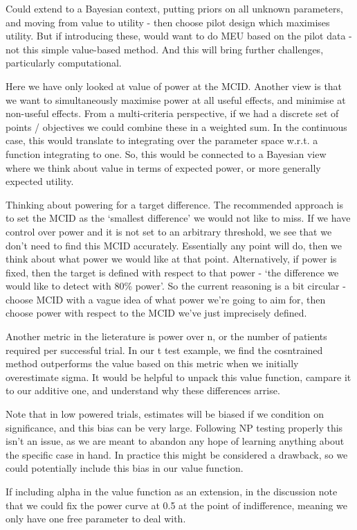 \documentclass[sagev, Crown]{sagej}
\begin{document}
Could extend to a Bayesian context, putting priors on all unknown parameters, and moving from value to utility - then choose pilot design which maximises utility. But if introducing these, would want to do MEU based on the pilot data - not this simple value-based method. And this will bring further challenges, particularly computational.

Here we have only looked at value of power at the MCID. Another view is that we want to simultaneously maximise power at all useful effects, and minimise at non-useful effects. From a multi-criteria perspective, if we had a discrete set of points / objectives we could combine these in a weighted sum. In the continuous case, this would translate to integrating over the parameter space w.r.t. a function integrating to one. So, this would be connected to a Bayesian view where we think about value in terms of expected power, or more generally expected utility. 

Thinking about powering for a target difference. The recommended approach is to set the MCID as the `smallest difference' we would not like to miss. If we have control over power and it is not set to an arbitrary threshold, we see that we don't need to find this MCID accurately. Essentially any point will do, then we think about what power we would like at that point. Alternatively, if power is fixed, then the target is defined with respect to that power - `the difference we would like to detect with 80\% power'. So the current reasoning is a bit circular - choose MCID with a vague idea of what power we're going to aim for, then choose power with respect to the MCID we've just imprecisely defined.

Another metric in the lieterature is power over n, or the number of patients required per successful trial. In our t test example, we find the cosntrained method outperforms the value based on this metric when we initially overestimate sigma. It would be helpful to unpack this value function, campare it to our additive one, and understand why these differences arrise.

Note that in low powered trials, estimates will be biased if we condition on significance, and this bias can be very large. Following NP testing properly this isn't an issue, as we are meant to abandon any hope of learning anything about the specific case in hand. In practice this might be considered a drawback, so we could potentially include this bias in our value function.

If including alpha in the value function as an extension, in the discussion note that we could fix the power curve at 0.5 at the point of indifference, meaning we only have one free parameter to deal with.
\end{document}

